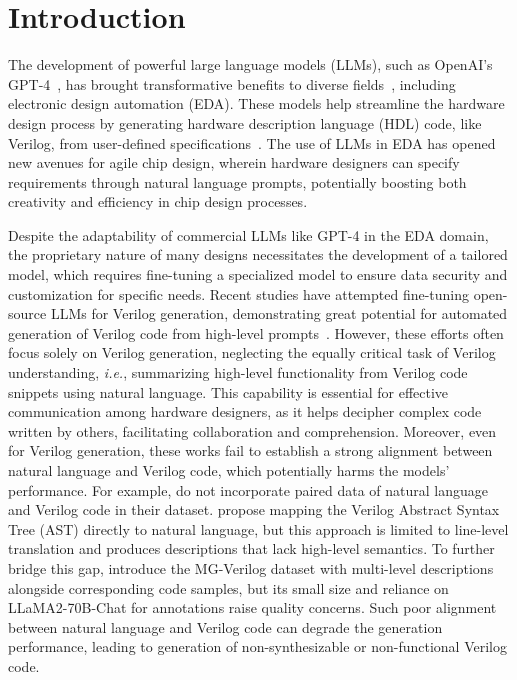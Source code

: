 \section{Introduction}

The development of powerful large language models (LLMs), such as OpenAI's GPT-4~\citep{achiam2023gpt}, has brought transformative benefits to diverse fields~\citep{wei2024editable,jin2023adapt}, %
including electronic design automation (EDA).
These models help streamline the hardware design process by generating hardware description language (HDL) code, like Verilog, from user-defined specifications~\citep{pearce2020dave,chang2023chipgpt}. 
The use of LLMs in EDA has opened new avenues for agile chip design, wherein hardware designers can specify requirements through natural language prompts, potentially boosting both creativity and efficiency in chip design processes.

Despite the adaptability of commercial LLMs like GPT-4 in the EDA domain, the proprietary nature of many designs necessitates the development of a tailored model, which requires fine-tuning a specialized model to ensure data security and customization for specific needs. Recent studies have attempted fine-tuning open-source LLMs for Verilog generation, demonstrating great potential for automated generation of Verilog code from high-level prompts~\citep{thakur2024verigen,chang2024data,zhang2024mg}. However, these efforts often focus solely on Verilog generation, neglecting the equally critical task of Verilog understanding, \textit{i.e.}, summarizing high-level functionality from Verilog code snippets using natural language. This capability is essential for effective communication among hardware designers, as it helps decipher complex code written by others, facilitating collaboration and comprehension. 
Moreover, even for Verilog generation, these works fail to establish a strong alignment between natural language and Verilog code, which potentially harms the models' performance.
For example, \citet{thakur2024verigen} do not incorporate paired data of natural language and Verilog code in their dataset. 
\citet{chang2024data} propose mapping the Verilog Abstract Syntax Tree (AST) directly to natural language, but this approach is limited to line-level translation and produces descriptions that lack high-level semantics. 
To further bridge this gap, \citet{zhang2024mg} introduce the MG-Verilog dataset with multi-level descriptions alongside corresponding code samples, but its small size and reliance on LLaMA2-70B-Chat for annotations raise quality concerns.
Such poor alignment between natural language and Verilog code can degrade the generation performance, leading to generation of non-synthesizable or non-functional Verilog code.

